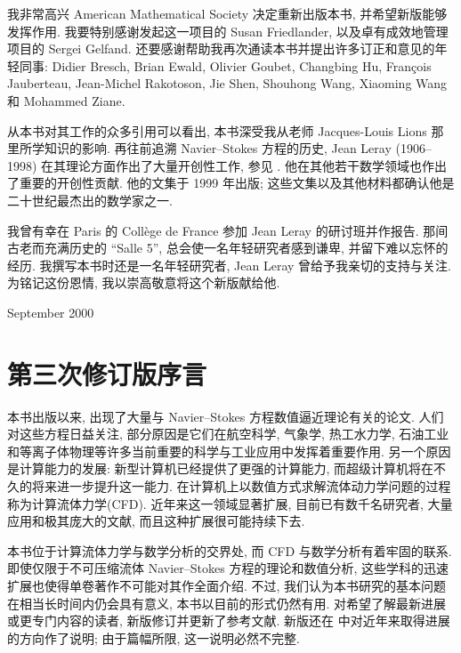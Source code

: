 我非常高兴 American Mathematical Society 决定重新出版本书, 并希望新版能够发挥作用. 我要特别感谢发起这一项目的 Susan Friedlander, 以及卓有成效地管理项目的 Sergei Gelfand. 还要感谢帮助我再次通读本书并提出许多订正和意见的年轻同事: Didier Bresch, Brian Ewald, Olivier Goubet, Changbing Hu, François Jauberteau, Jean-Michel Rakotoson, Jie Shen, Shouhong Wang, Xiaoming Wang 和 Mohammed Ziane.

从本书对其工作的众多引用可以看出, 本书深受我从老师 Jacques-Louis Lions 那里所学知识的影响. 再往前追溯 Navier--Stokes 方程的历史, Jean Leray (1906--1998) 在其理论方面作出了大量开创性工作, 参见 . 他在其他若干数学领域也作出了重要的开创性贡献. 他的文集于 1999 年出版; 这些文集以及其他材料都确认他是二十世纪最杰出的数学家之一.

我曾有幸在 Paris 的 Collège de France 参加 Jean Leray 的研讨班并作报告. 那间古老而充满历史的 ``Salle 5'', 总会使一名年轻研究者感到谦卑, 并留下难以忘怀的经历. 我撰写本书时还是一名年轻研究者, Jean Leray 曾给予我亲切的支持与关注. 为铭记这份恩情, 我以崇高敬意将这个新版献给他.

\begin{flushright}
September 2000
\end{flushright}

\clearpage
\section*{第三次修订版序言}
\label{front:preface-third-edition}

本书出版以来, 出现了大量与 Navier--Stokes 方程数值逼近理论有关的论文. 人们对这些方程日益关注, 部分原因是它们在航空科学, 气象学, 热工水力学, 石油工业和等离子体物理等许多当前重要的科学与工业应用中发挥着重要作用. 另一个原因是计算能力的发展: 新型计算机已经提供了更强的计算能力, 而超级计算机将在不久的将来进一步提升这一能力. 在计算机上以数值方式求解流体动力学问题的过程称为计算流体力学(CFD). 近年来这一领域显著扩展, 目前已有数千名研究者, 大量应用和极其庞大的文献, 而且这种扩展很可能持续下去.

本书位于计算流体力学与数学分析的交界处, 而 CFD 与数学分析有着牢固的联系. 即使仅限于不可压缩流体 Navier--Stokes 方程的理论和数值分析, 这些学科的迅速扩展也使得单卷著作不可能对其作全面介绍. 不过, 我们认为本书研究的基本问题在相当长时间内仍会具有意义, 本书以目前的形式仍然有用. 对希望了解最新进展或更专门内容的读者, 新版修订并更新了参考文献. 新版还在  中对近年来取得进展的方向作了说明; 由于篇幅所限, 这一说明必然不完整.

